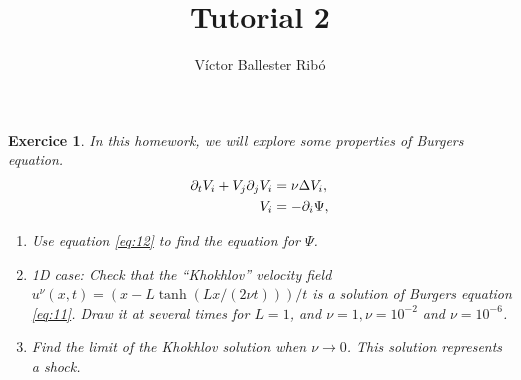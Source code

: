 \documentclass[10pt,a4paper]{article}
\title{\bfseries\Large Tutorial 2}
\author{Víctor Ballester Ribó}
\date{\parbox{\linewidth}{\centering
  Turbulence\endgraf
  M2 Applied and Theoretical Mathematics\endgraf
  Université Paris-Dauphine\endgraf
  Februrary 2024\endgraf}}
\newtheorem{exercici}{Exercice}
\theoremstyle{remark}
\begin{document}
\maketitle
\begin{exercici}\label{ex:1}
  In this homework, we will explore some properties of Burgers equation.
  \begin{align}
    \partial_t V_i + V_j \partial_j V_i & = \nu \Delta V_i,\label{eq:11} \\
    V_i                                 & = -\partial_i \Psi,\label{eq:12}
  \end{align}
  \begin{enumerate}
    \item Use equation \eqref{eq:12} to find the equation for $\Psi$.
    \item 1D case: Check that the ``Khokhlov'' velocity field $u^\nu(x,t) = (x - L \tanh(Lx/(2\nu t)))/t$ is a solution of Burgers equation \eqref{eq:11}. Draw it at several times for $L = 1$, and $\nu = 1, \nu = 10^{-2}$ and $\nu = 10^{-6}$.
    \item Find the limit of the Khokhlov solution when $\nu \to 0$. This solution represents a shock.
  \end{enumerate}
\end{exercici}
\end{document}

